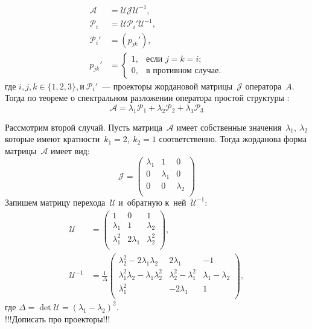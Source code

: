 $$
	\begin{aligned}
		\mathcal{A} &= \mathcal{U}\mathcal{J}\mathcal{U}^{-1}, \\
		\mathcal{P}_i &= \mathcal{U}\mathcal{P}_i'\mathcal{U}^{-1}, \\
		\mathcal{P}_i' &= \left(p_{jk}'\right), \\
		p_{jk}' &= 
		\begin{cases}
			1, & \text{если $j=k=i$;} \\
			0, & \text{в противном случае.}
		\end{cases}
	\end{aligned}
$$
где $i,j,k \in \{1,2,3\}, \text{и}\  \mathcal{P}_i'$~--- проекторы жордановой матрицы~$\mathcal{J}$ 
оператора~$A$. Тогда по теореме о спектральном разложении оператора простой структуры \cite{baskakov}:
$$
	\mathcal{A} = \lambda_1\mathcal{P}_1 + \lambda_2\mathcal{P}_2 + \lambda_3\mathcal{P}_3 
$$


Рассмотрим второй случай.		
Пусть матрица~$\mathcal{A}$ имеет собственные значения~$\lambda_1,~\lambda_2$ 
которые имеют кратности~$k_1=2,~k_2=1$ соответственно. Тогда жорданова форма матрицы~$\mathcal{A}$ имеет вид:
$$
 \mathcal{J} = 
 \begin{pmatrix}
  \lambda_1 & 1 & 0\\
  0 & \lambda_1 & 0 \\
  0 & 0 & \lambda_2 \\
 \end{pmatrix}
$$
Запишем матрицу перехода~$\mathcal{U}$ и~обратную к~ней~$\mathcal{U}^{-1}$:
$$
\begin{aligned}
 \mathcal{U} &= 
 \begin{pmatrix}
  	1 & 0 & 1\\
  	\lambda_1 & 1 & \lambda_2 \\
  	\lambda_1^2 & 2\lambda_1 & \lambda_2^2 \\
 \end{pmatrix}, \\
 \mathcal{U}^{-1} &= \frac{1}{\Delta} 
 \begin{pmatrix}
  	\lambda_2^2-2\lambda_1\lambda_2 & 2\lambda_1 & -1  \\
  	\lambda_1^2\lambda_2 - \lambda_1\lambda_2^2 & \lambda_2^2 - \lambda_1^2 & \lambda_1 - \lambda_2  \\
  	\lambda_1^2 & -2\lambda_1 & 1  \\
 \end{pmatrix},
\end{aligned}
$$
где $\Delta = \det \mathcal{U} = (\lambda_1-\lambda_2)^2$. \\
!!!Дописать про проекторы!!!

